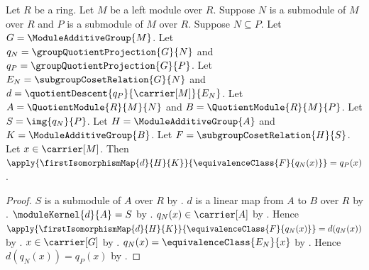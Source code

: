\begin{proposition}\label{module_third_isomorphism_map_apply}
    Let $R$ be a ring.
    Let $M$ be a left module over $R$.
    Suppose $N$ is a submodule of $M$ over $R$ and
        $P$ is a submodule of $M$ over $R$.
    Suppose $N\subseteq P$.
    Let $G=\ModuleAdditiveGroup{M}$.
    Let $q_N=\groupQuotientProjection{G}{N}$ and
        $q_P=\groupQuotientProjection{G}{P}$.
    Let $E_N=\subgroupCosetRelation{G}{N}$ and
        $d=\quotientDescent{q_P}{\carrier[M]}{E_N}$.
    Let $A=\QuotientModule{R}{M}{N}$ and
        $B=\QuotientModule{R}{M}{P}$.
    Let $S=\img{q_N}{P}$.
    Let $H=\ModuleAdditiveGroup{A}$ and
        $K=\ModuleAdditiveGroup{B}$.
    Let $F=\subgroupCosetRelation{H}{S}$.
    Let $x\in\carrier[M]$.
    Then
        $\apply{\firstIsomorphismMap{d}{H}{K}}{
            \equivalenceClass{F}{q_N(x)}}=q_P(x)$.
\end{proposition}
\begin{proof}
    $S$ is a submodule of $A$ over $R$ by
        .
    $d$ is a linear map from $A$ to $B$ over $R$ by
        .
    $\moduleKernel{d}{A}=S$ by
        .
    $q_N(x)\in\carrier[A]$ by
        .
    Hence
        $\apply{\firstIsomorphismMap{d}{H}{K}}{
            \equivalenceClass{F}{q_N(x)}}=d(q_N(x))$ by
        .
    $x\in\carrier[G]$ by
        .
    $q_N(x)=\equivalenceClass{E_N}{x}$ by
        .
    Hence $d(q_N(x))=q_P(x)$ by
        .
\end{proof}


